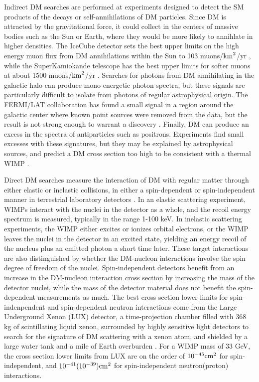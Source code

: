 \indent Indirect DM searches are performed at experiments designed to detect the SM products of the decays or self-annihilations of DM particles. Since DM is attracted by the gravitational force, it could collect in the centers of massive bodies such as the Sun or Earth, where they would be more likely to annihlate in higher densities. The IceCube detector sets the best upper limits on the high energy muon flux from DM annihilations within the Sun to 103 muons/$\rm{km}^2$/yr \cite{PhysRevLett.110.131302}, while the SuperKamiokande telescope has the best upper limits for softer muons at about 1500 muons/$\rm{km}^2$/yr \cite{0004-637X-742-2-78}. Searches for photons from DM annihilating in the galactic halo can produce mono-energetic photon spectra, but these signals are particularly difficult to isolate from photons of regular astrophysical origin. The FERMI/LAT collaboration has found a small signal in a region around the galactic center where known point sources were removed from the data, but the result is not strong enough to warrant a discovery \cite{Ackermann:2013uma}. Finally, DM can produce an excess in the spectra of antiparticles such as positrons. Experiments find small excesses with these signatures, but they may be explained by astrophysical sources, and predict a DM cross section too high to be consistent with a thermal WIMP \cite{Agashe:2014kda}.

\indent Direct DM searches measure the interaction of DM with regular matter through either elastic or inelastic collisions, in either a spin-dependent or spin-independent manner in terrestrial laboratory detectors \cite{Bertone:2004pz}. In an elastic scattering experiment, WIMPs interact with the nuclei in the detector as a whole, and the recoil energy spectrum is measured, typically in the range 1-100 keV. In inelastic scattering experiments, the WIMP either excites or ionizes orbital electrons, or the WIMP leaves the nuclei in the detector in an excited state, yielding an energy recoil of the nucleus plus an emitted photon a short time later. These target interactions are also distinguished by whether the DM-nucleon interactions involve the spin degree of freedom of the nuclei. Spin-independent detectors benefit from an increase in the DM-nucleon interaction cross section by increasing the mass of the detector nuclei, while the mass of the detector material does not benefit the spin-dependent measurements as much. The best cross section lower limits for spin-indenpendent and spin-dependent neutron interactions come from the Large Underground Xenon (LUX) detector, a time-projection chamber filled with 368 kg of scintillating liquid xenon, surrounded by highly sensitive light detectors to search for the signature of DM scattering with a xenon atom, and shielded by a large water tank and a mile of Earth overburden \cite{Akerib:2016lao}. For a WIMP mass of 33 GeV, the cross section lower limits from LUX are on the order of $10^{-45} \rm{cm}^2$ for spin-independent, and $10^{-41}(10^{-39}) \rm{cm}^2$ for spin-independent neutron(proton) interactions.

